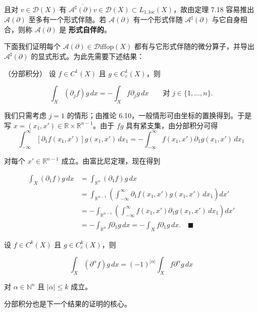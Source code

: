 且对 $ v \in \mathcal{D}(X) $ 有 $ \overline{\mathcal{A}^{\sharp}(\partial)v} \in \mathcal{D}(X) \subset L_{1,\mathrm{loc}}(X) $，故由定理 7.18 容易推出 $ \mathcal{A}(\partial) $ 至多有一个形式伴随。若 $ \mathcal{A}(\partial) $ 有一个形式伴随 $ \mathcal{A}^{\sharp}(\partial) $ 与它自身相合，则称 $ \mathcal{A}(\partial) $ 是 \textbf{形式自伴的}。

下面我们证明每个 $ \mathcal{A}(\partial) \in \mathcal{D}\mathrm{iffop}(X) $ 都有与它形式伴随的微分算子，并导出 $ \mathcal{A}^{\sharp}(\partial) $ 的显式形式。为此先需要下述结果：

\begin{proposition}

（分部积分） 设 $ f \in C^1(X) $ 且 $ g \in C_c^1(X) $，则

\[
\int_X (\partial_j f)g\, dx = -\int_X f\partial_j g\, dx \qquad \text{对 } j \in \{1,\dots,n\} .
\]

\proofhead
我们只需考虑 $ j = 1 $ 的情形；由推论 6.10，一般情形可由坐标的置换得到。于是写 $ x = (x_1, x') \in \mathbb{R} \times \mathbb{R}^{n-1} $。由于 $ fg $ 具有紧支集，由分部积分可得
\[
\int_{-\infty}^{\infty} [\partial_1 f(x_1, x')]g(x_1, x')\, dx_1 = -\int_{-\infty}^{\infty} f(x_1, x')\partial_1 g(x_1, x')\, dx_1
\]

对每个 $ x' \in \mathbb{R}^{n-1} $ 成立。由富比尼定理，现在得到

\begin{equation*}
\begin{aligned}
\int_X (\partial_1 f)g\, dx &= \int_{\mathbb{R}^n} (\partial_1 f)g\, dx \\ &= \int_{\mathbb{R}^{n-1}} \left( \int_{-\infty}^{\infty} \partial_1 f(x_1, x')g(x_1, x')\, dx_1 \right) dx' \\ &= -\int_{\mathbb{R}^{n-1}} \left( \int_{-\infty}^{\infty} f(x_1, x')\partial_1 g(x_1, x')\, dx_1 \right) dx' \\ &= -\int_{\mathbb{R}^n} f\partial_1 g\, dx = -\int_X f\partial_1 g\, dx . \quad \blacksquare
\end{aligned}
\end{equation*}
\end{proposition}

\begin{corollary}

设 $ f \in C^k(X) $ 且 $ g \in C_c^k(X) $，则

\[
\int_X (\partial^{\alpha} f)g\, dx = (-1)^{|\alpha|} \int_X f\partial^{\alpha} g\, dx
\]

对 $ \alpha \in \mathbb{N}^n $ 且 $ |\alpha| \le k $ 成立。

分部积分也是下一个结果的证明的核心。

\end{corollary}

